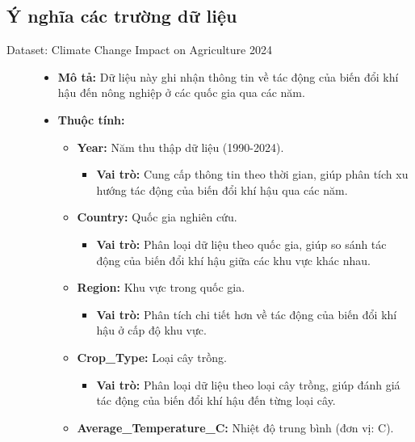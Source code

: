 \subsection{Ý nghĩa các trường dữ liệu}

\begin{description}
    \item[Dataset: Climate Change Impact on Agriculture 2024]

    \begin{itemize} 
        \item \textbf{Mô tả:} Dữ liệu này ghi nhận thông tin về tác động của biến đổi khí hậu đến nông nghiệp ở các quốc gia qua các năm.
        \item \textbf{Thuộc tính:}
        \begin{itemize}
            \item \textbf{Year:} Năm thu thập dữ liệu (1990-2024).
            \begin{itemize}
                \item \textbf{Vai trò:} Cung cấp thông tin theo thời gian, giúp phân tích xu hướng tác động của biến đổi khí hậu qua các năm.
            \end{itemize}
            \item \textbf{Country:} Quốc gia nghiên cứu.
            \begin{itemize}
                \item \textbf{Vai trò:} Phân loại dữ liệu theo quốc gia, giúp so sánh tác động của biến đổi khí hậu giữa các khu vực khác nhau.
            \end{itemize}
            \item \textbf{Region:} Khu vực trong quốc gia.
            \begin{itemize}
                \item \textbf{Vai trò:} Phân tích chi tiết hơn về tác động của biến đổi khí hậu ở cấp độ khu vực.
            \end{itemize}
            \item \textbf{Crop\_Type:} Loại cây trồng.
            \begin{itemize}
                \item \textbf{Vai trò:} Phân loại dữ liệu theo loại cây trồng, giúp đánh giá tác động của biến đổi khí hậu đến từng loại cây.
            \end{itemize}
            \item \textbf{Average\_Temperature\_C:} Nhiệt độ trung bình (đơn vị: \textdegree C).
            \begin{itemize}

\end{itemize}
\end{itemize}
\end{itemize}
\end{description}
